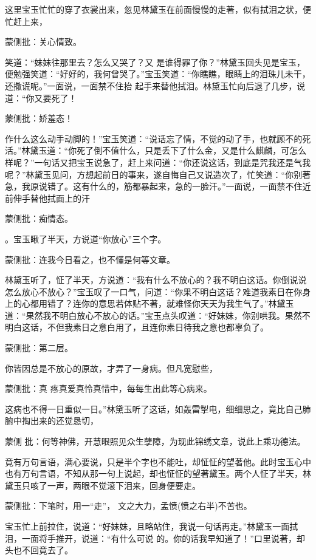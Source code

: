 \begin{parag}


    这里宝玉忙忙的穿了衣裳出来，忽见林黛玉在前面慢慢的走著，似有拭泪之状，便忙赶上来，\begin{note}蒙侧批：关心情致。\end{note}笑道：“妹妹往那里去？怎么又哭了？又 是谁得罪了你？”林黛玉回头见是宝玉，便勉强笑道：“好好的，我何曾哭了。”宝玉笑道：“你瞧瞧，眼睛上的泪珠儿未干，还撒谎呢。”一面说，一面禁不住抬 起手来替他拭泪。林黛玉忙向后退了几步，说道：“你又要死了！\begin{note}蒙侧批：娇羞态！\end{note}作什么这么动手动脚的！”宝玉笑道：“说话忘了情，不觉的动了手，也就顾不的死活。”林黛玉道：“你死了倒不值什么，只是丢下了什么金，又是什么麒麟，可怎么样呢？”一句话又把宝玉说急了，赶上来问道：“你还说这话，到底是咒我还是气我呢？”林黛玉见问，方想起前日的事来，遂自悔自己又说造次了，忙笑道：“你别著急，我原说错了。这有什么的，筋都暴起来，急的一脸汗。”一面说，一面禁不住近前伸手替他拭面上的汗\begin{note}蒙侧批：痴情态。\end{note}。宝玉瞅了半天，方说道“你放心”三个字。\begin{note}蒙侧批：连我今日看之，也不懂是何等文章。\end{note}林黛玉听了，怔了半天，方说道：“我有什么不放心的？我不明白这话。你倒说说怎么放心不放心？”宝玉叹了一口气，问道：“你果不明白这话？难道我素日在你身上的心都用错了？连你的意思若体贴不著，就难怪你天天为我生气了。”林黛玉道：“果然我不明白放心不放心的话。”宝玉点头叹道：“好妹妹，你别哄我。果然不 明白这话，不但我素日之意白用了，且连你素日待我之意也都辜负了。\begin{note}蒙侧批：第二层。\end{note}你皆因总是不放心的原故，才弄了一身病。但凡宽慰些，\begin{note}蒙侧批：真 疼真爱真怜真惜中，每每生出此等心病来。\end{note}这病也不得一日重似一日。”林黛玉听了这话，如轰雷掣电，细细思之，竟比自己肺腑中掏出来的还觉恳切，\begin{note}蒙侧 批：何等神佛，开慧眼照见众生孽障，为现此锦绣文章，说此上乘功德法。\end{note}竟有万句言语，满心要说，只是半个字也不能吐，却怔怔的望著他。此时宝玉心中也有万句言语，不知从那一句上说起，却也怔怔的望著黛玉。两个人怔了半天，林黛玉只咳了一声，两眼不觉滚下泪来，回身便要走。\begin{note}蒙侧批：下笔时，用一“走”， 文之大力，孟愤(愤之右半)不苦也。\end{note}宝玉忙上前拉住，说道：“好妹妹，且略站住，我说一句话再走。”林黛玉一面拭泪，一面将手推开，说道：“有什么可说 的。你的话我早知道了！”口里说著，却头也不回竟去了。
\end{parag}


